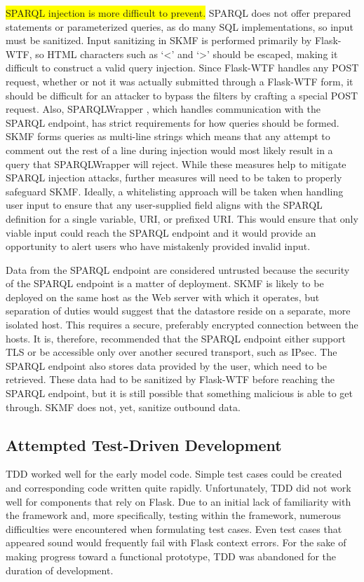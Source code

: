 \colorbox{yellow}{SPARQL injection is more difficult to prevent.}
SPARQL does not offer prepared statements or parameterized queries, as do many SQL implementations, so input must be sanitized. Input sanitizing in SKMF is performed primarily by Flask-WTF, so HTML characters such as `\textless' and `\textgreater' should be escaped, making it difficult to construct a valid query injection. Since Flask-WTF handles any POST request, whether or not it was actually submitted through a Flask-WTF form, it should be difficult for an attacker to bypass the filters by crafting a special POST request. Also, SPARQLWrapper
\cite{sparqlwrapper},
which handles communication with the SPARQL endpoint, has strict requirements for how queries should be formed. SKMF forms queries as multi-line strings which means that any attempt to comment out the rest of a line during injection would most likely result in a query that SPARQLWrapper will reject. While these measures help to mitigate SPARQL injection attacks, further measures will need to be taken to properly safeguard SKMF. Ideally, a whitelisting approach will be taken when handling user input to ensure that any user-supplied field aligns with the SPARQL definition for a single variable, URI, or prefixed URI. This would ensure that only viable input could reach the SPARQL endpoint and it would provide an opportunity to alert users who have mistakenly provided invalid input.

Data from the SPARQL endpoint are considered untrusted because the security of the SPARQL endpoint is a matter of deployment. SKMF is likely to be deployed on the same host as the Web server with which it operates, but separation of duties would suggest that the datastore reside on a separate, more isolated host. This requires a secure, preferably encrypted connection between the hosts. It is, therefore, recommended that the SPARQL endpoint either support TLS or be accessible only over another secured transport, such as IPsec. The SPARQL endpoint also stores data provided by the user, which need to be retrieved. These data had to be sanitized by Flask-WTF before reaching the SPARQL endpoint, but it is still possible that something malicious is able to get through. SKMF does not, yet, sanitize outbound data.


\subsection{Attempted Test-Driven Development}
\label{method:tdd}

TDD worked well for the early model code. Simple test cases could be created and corresponding code written quite rapidly. Unfortunately, TDD did not work well for components that rely on Flask. Due to an initial lack of familiarity with the framework and, more specifically, testing within the framework, numerous difficulties were encountered when formulating test cases. Even test cases that appeared sound would frequently fail with Flask context errors. For the sake of making progress toward a functional prototype, TDD was abandoned for the duration of development.

